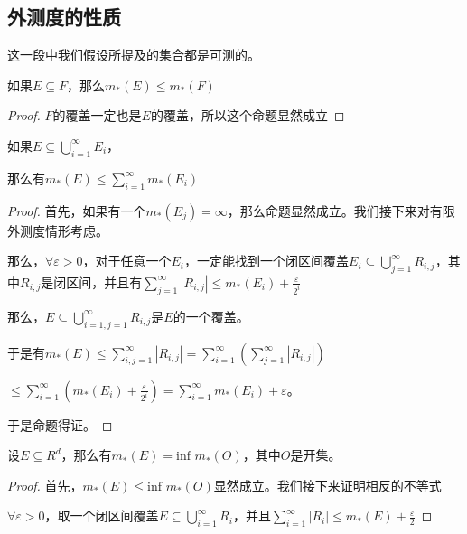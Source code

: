 \documentclass[12pt, a4paper, oneside, UTF8]{ctexbook}
\begin{document}
		\subsection{外测度的性质}
		这一段中我们假设所提及的集合都是可测的。
		\begin{para}{0}
				\begin{proposition}
					如果$E \subseteq F$，那么$m_*(E) \leqslant m_*(F)$
				\end{proposition}
				\begin{proof}
					$F$的覆盖一定也是$E$的覆盖，所以这个命题显然成立
				\end{proof}
				\begin{proposition}
					如果$E \subseteq \bigcup\limits_{i=1}^{\infty} E_i$，
					
					那么有$m_*(E) \leqslant \sum\limits_{i=1}^{\infty} m_*(E_i)$
				\end{proposition}
				\begin{proof}
					首先，如果有一个$m_*(E_j) = \infty$，那么命题显然成立。我们接下来对有限外测度情形考虑。
					
					那么，$\forall \varepsilon > 0$，对于任意一个$E_i$，一定能找到一个闭区间覆盖$E_i \subseteq \bigcup\limits_{j=1}^{\infty} R_{i,j}$，其中$R_{i,j}$是闭区间，并且有$\sum\limits_{j=1}^{\infty} |R_{i,j}| \leqslant m_*(E_i) + \frac{\varepsilon}{2^i}$
					
					那么，$E \subseteq \bigcup\limits_{i=1,j=1}^{\infty} R_{i,j}$是$E$的一个覆盖。
					
					于是有$m_*(E) \leqslant \sum\limits_{i,j=1}^{\infty} |R_{i,j}| = \sum\limits_{i=1}^{\infty} \left(\sum\limits_{j=1}^{\infty} |R_{i,j}|\right)$
					
					$\leqslant \sum\limits_{i=1}^{\infty} \left(m_*(E_i) + \frac{\varepsilon}{2^i}\right) = \sum\limits_{i=1}^{\infty} m_*(E_i) + \varepsilon$。
					
					于是命题得证。
				\end{proof}
			\point{}
				\begin{proposition}
					设$E \subseteq R^d$，那么有$m_*(E) = \text{inf }m_*(O)$，其中$O$是开集。
				\end{proposition}
				\begin{proof}
					首先，$m_*(E) \leqslant \text{inf }m_*(O)$显然成立。我们接下来证明相反的不等式
					
					$\forall \varepsilon > 0$，取一个闭区间覆盖$E \subseteq \bigcup\limits_{i=1}^{\infty} R_i$，并且$\sum\limits_{i=1}^{\infty} |R_i| \leqslant m_*(E) + \frac{\varepsilon}{2}$
					

\end{proof}
\end{para}
\end{document}
